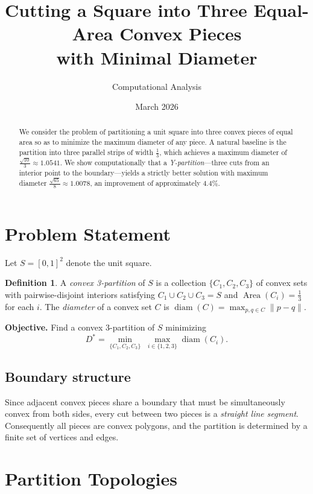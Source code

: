 \documentclass[11pt]{article}
\title{Cutting a Square into Three Equal-Area Convex Pieces\\with Minimal Diameter}
\author{Computational Analysis}
\date{March 2026}
\theoremstyle{definition}
\newtheorem{definition}[theorem]{Definition}
\begin{document}
\maketitle

\begin{abstract}
We consider the problem of partitioning a unit square into three convex
pieces of equal area so as to minimize the maximum diameter of any piece.
A natural baseline is the partition into three parallel strips of width
$\tfrac{1}{3}$, which achieves a maximum diameter of $\tfrac{\sqrt{10}}{3}
\approx 1.0541$. We show computationally that a \emph{Y-partition}---three
cuts from an interior point to the boundary---yields a strictly better
solution with maximum diameter $\tfrac{\sqrt{65}}{8} \approx 1.0078$, an
improvement of approximately $4.4\%$.
\end{abstract}

\section{Problem Statement}

Let $S = [0,1]^2$ denote the unit square.

\begin{definition}
A \emph{convex 3-partition} of $S$ is a collection $\{C_1, C_2, C_3\}$
of convex sets with pairwise-disjoint interiors satisfying $C_1 \cup C_2
\cup C_3 = S$ and $\operatorname{Area}(C_i) = \tfrac{1}{3}$ for each $i$.
The \emph{diameter} of a convex set $C$ is $\operatorname{diam}(C) =
\max_{p,q\in C} \|p - q\|$.
\end{definition}

\medskip\noindent\textbf{Objective.}
Find a convex 3-partition of $S$ minimizing
\[
  D^* = \min_{\{C_1,C_2,C_3\}} \; \max_{i \in \{1,2,3\}} \operatorname{diam}(C_i).
\]

\subsection*{Boundary structure}

Since adjacent convex pieces share a boundary that must be simultaneously
convex from both sides, every cut between two pieces is a \emph{straight
line segment}. Consequently all pieces are convex polygons, and the
partition is determined by a finite set of vertices and edges.

\section{Partition Topologies}
\end{document}
